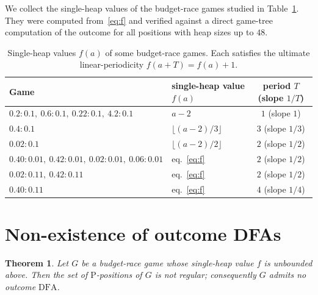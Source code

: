 \documentclass[11pt]{article}
\newtheorem{theorem}{Theorem}[section]
\newcommand{\outP}{\ensuremath{\mathrm{P}}}
\newcommand{\DFA}{\ensuremath{\mathrm{DFA}}}
\begin{document}
We collect the single-heap values of the budget-race games studied in
Table~\ref{tab:values}. They were computed from~\eqref{eq:f} and verified against a direct
game-tree computation of the outcome for all positions with heap sizes up to $48$.

\begin{table}[ht]
\centering
\begin{tabular}{l|l|c}
Game & single-heap value $f(a)$ & period $T$ (slope $1/T$)\\
\hline
$0.2:0.1,\ 0.6:0.1,\ 0.22:0.1,\ 4.2:0.1$ & $a-2$ & $1$ (slope $1$)\\
$0.4:0.1$ & $\lfloor(a-2)/3\rfloor$ & $3$ (slope $1/3$)\\
$0.02:0.1$ & $\lfloor(a-2)/2\rfloor$ & $2$ (slope $1/2$)\\
$0.40:0.01,\ 0.42:0.01,\ 0.02:0.01,\ 0.06:0.01$ & eq.~\eqref{eq:f} & $2$ (slope $1/2$)\\
$0.02:0.11,\ 0.42:0.11$ & eq.~\eqref{eq:f} & $2$ (slope $1/2$)\\
$0.40:0.11$ & eq.~\eqref{eq:f} & $4$ (slope $1/4$)
\end{tabular}
\caption{Single-heap values $f(a)$ of some budget-race games. Each satisfies the ultimate
linear-periodicity $f(a+T)=f(a)+1$.}
\label{tab:values}
\end{table}

\section{Non-existence of outcome DFAs}\label{sec:no-dfa}

\begin{theorem}\label{thm:no-dfa}
Let $G$ be a budget-race game whose single-heap value $f$ is unbounded above. Then the set of
$\outP$-positions of $G$ is not regular; consequently $G$ admits no outcome \DFA.
\end{theorem}
\end{document}
